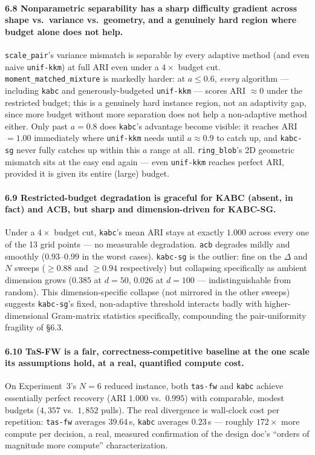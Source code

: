 \documentclass[11pt]{article}
\begin{document}
\paragraph{6.8 Nonparametric separability has a sharp difficulty gradient
across shape vs.\ variance vs.\ geometry, and a genuinely hard region where
budget alone does not help.} \texttt{scale\_pair}'s variance mismatch is
separable by every adaptive method (and even naive \texttt{unif-kkm}) at
full ARI even under a $4\times$ budget cut. \texttt{moment\_matched\_mixture}
is markedly harder: at $a\le0.6$, \emph{every} algorithm --- including
\texttt{kabc} and generously-budgeted \texttt{unif-kkm} --- scores ARI
$\approx0$ under the restricted budget; this is a genuinely hard instance
region, not an adaptivity gap, since more budget without more separation
does not help a non-adaptive method either. Only past $a=0.8$ does
\texttt{kabc}'s advantage become visible: it reaches ARI $=1.00$ immediately
where \texttt{unif-kkm} needs until $a\approx0.9$ to catch up, and
\texttt{kabc-sg} never fully catches up within this $a$ range at all.
\texttt{ring\_blob}'s 2D geometric mismatch sits at the easy end again ---
even \texttt{unif-kkm} reaches perfect ARI, provided it is given its entire
(large) budget.

\paragraph{6.9 Restricted-budget degradation is graceful for KABC (absent, in
fact) and ACB, but sharp and dimension-driven for KABC-SG.}
Under a $4\times$ budget cut, \texttt{kabc}'s mean ARI stays at exactly $1.000$
across every one of the 13 grid points --- no measurable degradation. \texttt{acb}
degrades mildly and smoothly ($0.93$--$0.99$ in the worst cases). \texttt{kabc-sg}
is the outlier: fine on the $\Delta$ and $N$ sweeps ($\ge 0.88$ and $\ge 0.94$
respectively) but collapsing specifically as ambient dimension grows ($0.385$
at $d=50$, $0.026$ at $d=100$ --- indistinguishable from random). This
dimension-specific collapse (not mirrored in the other sweeps) suggests
\texttt{kabc-sg}'s fixed, non-adaptive threshold interacts badly with
higher-dimensional Gram-matrix statistics specifically, compounding the
pair-uniformity fragility of \S6.3.

\paragraph{6.10 TaS-FW is a fair, correctness-competitive baseline at the one
scale its assumptions hold, at a real, quantified compute cost.}
On Experiment~3's $N=6$ reduced instance, both \texttt{tas-fw} and \texttt{kabc}
achieve essentially perfect recovery (ARI $1.000$ vs.\ $0.995$) with comparable,
modest budgets ($4{,}357$ vs.\ $1{,}852$ pulls). The real divergence is wall-clock
cost per repetition: \texttt{tas-fw} averages $39.64$\,s, \texttt{kabc} averages
$0.23$\,s --- roughly $172\times$ more compute per decision, a real, measured
confirmation of the design doc's ``orders of magnitude more compute''
characterization.
\end{document}
